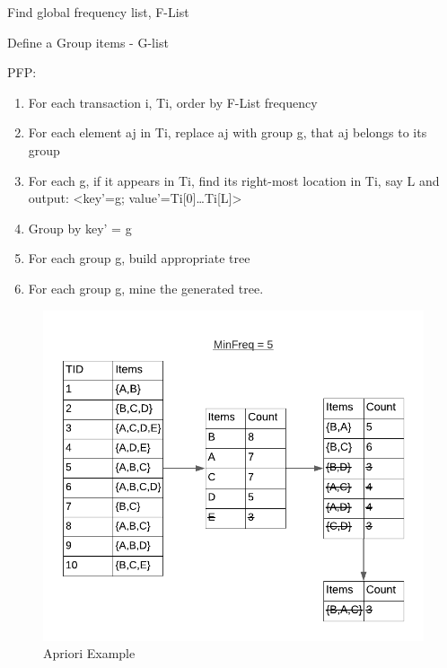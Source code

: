 \begin{steps}
	\item Find global frequency list, F-List
	\item Define a Group items - G-list
	\item PFP:
		\begin{enumerate}
			\item For each transaction i, Ti, order by F-List frequency
			\item For each element aj in Ti, replace aj with group g, that aj belongs to its group
			\item For each g, if it appears in Ti, find its right-most location in Ti, say L and output:
 <key'=g; value'={Ti[0]…Ti[L]}>
 			\item Group by key' = g
 			\item For each group g, build appropriate tree
 			\item For each group g, mine the generated tree.
		\end{enumerate}
\end{steps}

\begin{figure}
  \centering
  \includegraphics[width=\linewidth]{figures/aprioriexample}
  \caption{Apriori Example}
  \label{fig:aprioriexample}
\end{figure}

